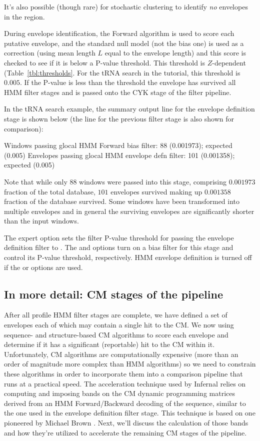 It's also possible (though rare) for stochastic clustering to identify
\emph{no} envelopes in the region.

During envelope identification, the Forward algorithm is used to score
each putative envelope, and the standard null model (not the bias one)
is used as a correction (using mean length $L$ equal to the envelope
length) and this score is checked to see if it is below a P-value
threshold. This threshold is $Z$-dependent
(Table~\ref{tbl:thresholds}. For the tRNA search in the tutorial, this
threshold is $0.005$. If the P-value is less than the threshold the
envelope has survived all HMM filter stages and is passed onto the CYK
stage of the filter pipeline. 

In the tRNA search example, the summary output line for the envelope
definition stage is shown below (the line for the previous filter stage is also
shown for comparison):

\begin{sreoutput}
Windows   passing glocal HMM Forward  bias filter:              88  (0.001973); expected (0.005)
Envelopes passing glocal HMM envelope defn filter:             101  (0.001358); expected (0.005)
\end{sreoutput}

Note that while only $88$ windows were passed into this stage,
comprising $0.001973$ fraction of the total database, $101$ envelopes
survived making up $0.001358$ fraction of the database survived. Some
windows have been transformed into multiple envelopes and in general
the surviving envelopes are significantly shorter than the input
windows. 

The  expert option sets the filter P-value threshold for
passing the envelope definition filter to . The  and
 options turn on a bias filter for this stage 
and control its P-value threshold, respectively. HMM envelope
definition is turned off if the  or 
options are used.

\subsection{In more detail: CM stages of the pipeline}

After all profile HMM filter stages are complete, we have defined a
set of envelopes each of which may contain a single hit to the CM. We
now using sequence- and structure-based CM algorithms to score each
envelope and determine if it has a significant (reportable) hit to the
CM within it. Unfortunately, CM algorithms are computationally
expensive (more than an order of magnitude more complex than HMM
algorithms) so we need to constrain these algorithms in order to
incorporate them into a comparison pipeline that runs at a practical
speed. The acceleration technique used by Infernal relies on computing
and imposing bands on the CM dynamic programming matrices derived from
an HMM Forward/Backward decoding of the sequence, similar to the one
used in the envelope definition filter stage. This technique is based
on one pioneered by Michael Brown \citep{Brown00}. Next, we'll discuss the
calculation of those bands and how they're utilized to accelerate the
remaining CM stages of the pipeline.

